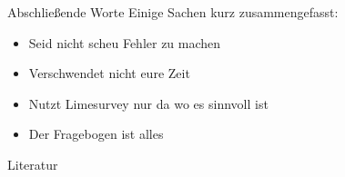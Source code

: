 \documentclass[aspectratio=1610, 9pt]{beamer}
\begin{document}
\begin{frame}
	{Abschließende Worte}
	Einige Sachen kurz zusammengefasst:
	\begin{itemize}
		\item Seid nicht scheu Fehler zu machen
		\item Verschwendet nicht eure Zeit
		\item Nutzt Limesurvey nur da wo es sinnvoll ist
		\item Der Fragebogen ist alles
	\end{itemize}
\end{frame}

\begin{frame}{Literatur}
	\printbibliography{}
\end{frame}
\end{document}
